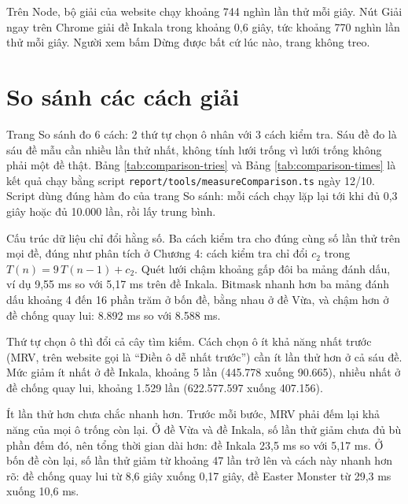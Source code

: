 Trên Node, bộ giải của website chạy khoảng 744 nghìn lần thử mỗi giây. Nút Giải ngay trên Chrome giải đề Inkala trong khoảng 0,6 giây, tức khoảng 770 nghìn lần thử mỗi giây. Người xem bấm Dừng được bất cứ lúc nào, trang không treo.

\section{So sánh các cách giải}

Trang So sánh đo 6 cách: 2 thứ tự chọn ô nhân với 3 cách kiểm tra. Sáu đề đo là sáu đề mẫu cần nhiều lần thử nhất, không tính lưới trống vì lưới trống không phải một đề thật. Bảng \ref{tab:comparison-tries} và Bảng \ref{tab:comparison-times} là kết quả chạy bằng script \texttt{report/tools/measureComparison.ts} ngày 12/10. Script dùng đúng hàm đo của trang So sánh: mỗi cách chạy lặp lại tới khi đủ 0,3 giây hoặc đủ 10.000 lần, rồi lấy trung bình.

\begin{table}[H]
  \centering
  \caption{Số lần thử theo thứ tự chọn ô (ba cách kiểm tra cho cùng một số)}
  \label{tab:comparison-tries}
  \small
  
\end{table}

\begin{table}[H]
  \centering
  \caption{Thời gian mỗi lần giải, tính bằng mili giây. Lưới: quét lại lưới; Sổ: ba mảng đánh dấu; Công tắc: bitmask}
  \label{tab:comparison-times}
  \small
  
\end{table}

Cấu trúc dữ liệu chỉ đổi hằng số. Ba cách kiểm tra cho đúng cùng số lần thử trên mọi đề, đúng như phân tích ở Chương 4: cách kiểm tra chỉ đổi \(c_2\) trong \(T(n) = 9\,T(n-1) + c_2\). Quét lưới chậm khoảng gấp đôi ba mảng đánh dấu, ví dụ 9,55 ms so với 5,17 ms trên đề Inkala. Bitmask nhanh hơn ba mảng đánh dấu khoảng 4 đến 16 phần trăm ở bốn đề, bằng nhau ở đề Vừa, và chậm hơn ở đề chống quay lui: 8.892 ms so với 8.588 ms.

Thứ tự chọn ô thì đổi cả cây tìm kiếm. Cách chọn ô ít khả năng nhất trước (MRV, trên website gọi là ``Điền ô dễ nhất trước'') cần ít lần thử hơn ở cả sáu đề. Mức giảm ít nhất ở đề Inkala, khoảng 5 lần (445.778 xuống 90.665), nhiều nhất ở đề chống quay lui, khoảng 1.529 lần (622.577.597 xuống 407.156).

Ít lần thử hơn chưa chắc nhanh hơn. Trước mỗi bước, MRV phải đếm lại khả năng của mọi ô trống còn lại. Ở đề Vừa và đề Inkala, số lần thử giảm chưa đủ bù phần đếm đó, nên tổng thời gian dài hơn: đề Inkala 23,5 ms so với 5,17 ms. Ở bốn đề còn lại, số lần thử giảm từ khoảng 47 lần trở lên và cách này nhanh hơn rõ: đề chống quay lui từ 8,6 giây xuống 0,17 giây, đề Easter Monster từ 29,3 ms xuống 10,6 ms.

